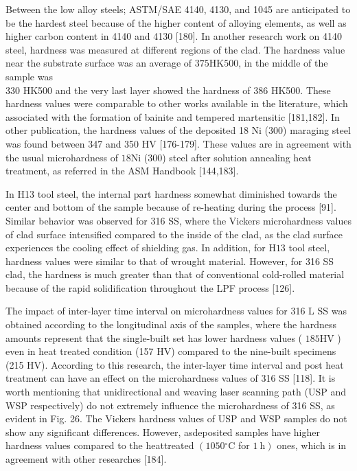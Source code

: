 \documentclass[10pt]{article}
\begin{document}
Between the low alloy steels; ASTM/SAE 4140, 4130, and 1045 are anticipated to be the hardest steel because of the higher content of alloying elements, as well as higher carbon content in 4140 and 4130 [180]. In another research work on 4140 steel, hardness was measured at different regions of the clad. The hardness value near the substrate surface was an average of $375 \mathrm{HK500}$, in the middle of the sample was\\
330 HK500 and the very last layer showed the hardness of 386 HK500. These hardness values were comparable to other works available in the literature, which associated with the formation of bainite and tempered martensitic [181,182]. In other publication, the hardness values of the deposited 18 Ni (300) maraging steel was found between 347 and 350 HV [176-179]. These values are in agreement with the usual microhardness of $18 \mathrm{Ni}$ (300) steel after solution annealing heat treatment, as referred in the ASM Handbook [144,183].

In H13 tool steel, the internal part hardness somewhat diminished towards the center and bottom of the sample because of re-heating during the process [91]. Similar behavior was observed for 316 SS, where the Vickers microhardness values of clad surface intensified compared to the inside of the clad, as the clad surface experiences the cooling effect of shielding gas. In addition, for $\mathrm{H} 13$ tool steel, hardness values were similar to that of wrought material. However, for 316 SS clad, the hardness is much greater than that of conventional cold-rolled material because of the rapid solidification throughout the LPF process [126].

The impact of inter-layer time interval on microhardness values for 316 L SS was obtained according to the longitudinal axis of the samples, where the hardness amounts represent that the single-built set has lower hardness values ( $185 \mathrm{HV}$ ) even in heat treated condition (157 HV) compared to the nine-built specimens (215 HV). According to this research, the inter-layer time interval and post heat treatment can have an effect on the microhardness values of 316 SS [118]. It is worth mentioning that unidirectional and weaving laser scanning path (USP and WSP respectively) do not extremely influence the microhardness of 316 SS, as evident in Fig. 26. The Vickers hardness values of USP and WSP samples do not show any significant differences. However, asdeposited samples have higher hardness values compared to the heattreated $\left(1050{ }^{\circ} \mathrm{C}\right.$ for $\left.1 \mathrm{~h}\right)$ ones, which is in agreement with other researches [184].
\end{document}
